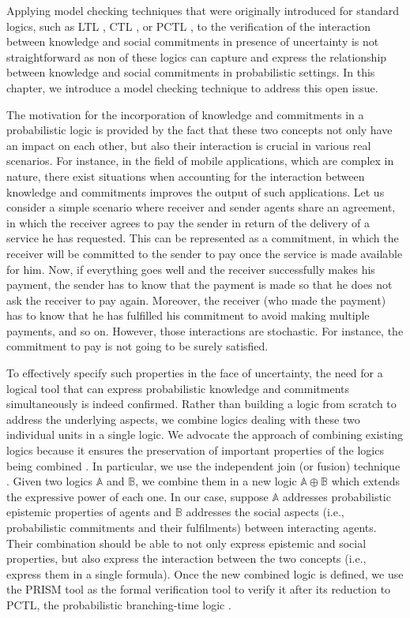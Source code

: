 Applying model checking techniques that were originally introduced
for standard logics, such as LTL \cite{Pnueli1977}, CTL
\cite{Emerson1990}, or PCTL \cite{Hansson1994}, to the
verification of the interaction between knowledge and social
commitments in presence of uncertainty is not straightforward as
non of these logics can capture and express the relationship
between knowledge and social commitments in probabilistic
settings. In this chapter, we introduce a model checking technique to address this open issue.

The motivation for the incorporation of knowledge and commitments
in a probabilistic logic is provided by the fact that these two
concepts not only have an impact on each other, but also their
interaction is crucial in various real scenarios. For instance, in
the field of mobile applications, which are complex in nature,
there exist situations when accounting for the interaction between
knowledge and commitments improves the output of such
applications. Let us consider a simple scenario where receiver and
sender agents share an agreement, in which the receiver agrees to
pay the sender in return of the delivery of a service he has
requested. This can be represented as a commitment, in which the
receiver will be committed to the sender to pay once the service
is made available for him. Now, if everything goes well and the
receiver successfully makes his payment, the sender has to know
that the payment is made so that he does not ask the receiver to
pay again. Moreover, the receiver (who made the payment) has to
know that he has fulfilled his commitment to avoid making multiple
payments, and so on. However, those interactions are stochastic.
For instance, the commitment to pay is not going to be surely
satisfied.


To effectively specify such properties in the face of uncertainty,
the need for a logical tool that can express probabilistic
knowledge and commitments simultaneously is indeed confirmed.
Rather than building a logic from scratch to address the
underlying aspects, we combine logics dealing with these two
individual units in a single logic. We advocate the approach of
combining existing logics because it ensures the preservation of
important properties of the logics being combined
\cite{Konur2013}. In particular, we use the independent join (or
fusion) technique \cite{Franceschet2004}. Given two logics $\mathbb{A}$ and $\mathbb{B}$, we combine them in a new logic $\mathds{A} \oplus \mathds{B}$ which extends the expressive power of each one. In our case, suppose $\mathds{A}$ addresses probabilistic epistemic properties of
agents and $\mathds{B}$ addresses the social aspects (i.e.,
probabilistic commitments and their fulfilments) between
interacting agents. Their combination should be able to not only
express epistemic and social properties, but also express the
interaction between the two concepts (i.e., express them in a
single formula). Once the new combined logic is defined, we use
the PRISM tool \cite{Kwiatkowska2002} as the formal verification tool to verify it after its reduction to PCTL, the probabilistic branching-time logic \cite{Hansson1994}.

